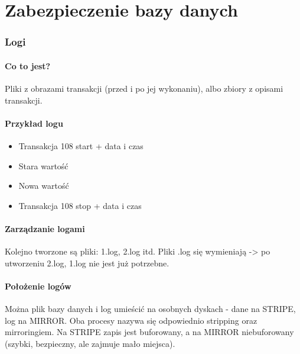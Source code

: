 \documentclass[a4paper,twoside]{article}
\begin{document}
  	\part*{Zabezpieczenie bazy danych}
  	
  	\section*{Logi}
  	\subsection*{Co to jest?}
  	Pliki z obrazami transakcji (przed i po jej wykonaniu), albo zbiory z opisami transakcji.
  	\subsection*{Przykład logu}
  	\begin{itemize}
  		\item Transakcja 108 start  + data i czas
  		\item Stara wartość
  		\item Nowa wartość
  		\item Transakcja 108 stop + data i czas
  	\end{itemize}
  	\subsection*{Zarządzanie logami}
  	Kolejno tworzone są pliki: 1.log, 2.log itd. Pliki .log się wymieniają -> po utworzeniu 2.log, 1.log nie jest już potrzebne.
  	\subsection*{Położenie logów}
  	Można plik bazy danych i log umieścić na osobnych dyskach - dane na STRIPE, log na MIRROR. Oba procesy nazywa się odpowiednio stripping oraz mirroringiem. Na STRIPE zapis jest buforowany, a na MIRROR niebuforowany (szybki, bezpieczny, ale zajmuje mało miejsca).
  	
\end{document}
